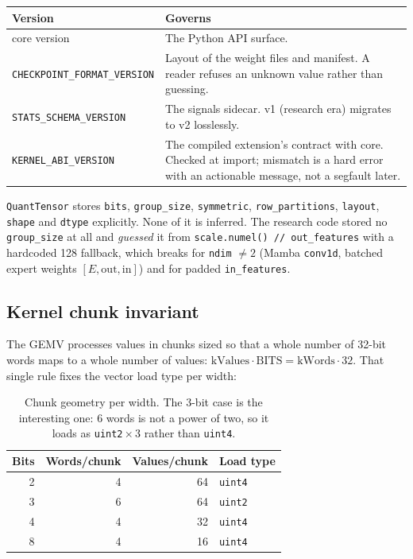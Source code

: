 \documentclass[11pt]{article}
\newcommand{\code}[1]{\texttt{#1}}
\begin{document}
\begin{table}[H]
\centering\small
\begin{tabular}{lp{}}
\toprule
Version & Governs \\
\midrule
core version & The Python API surface. \\
\rowcolor{rowtint}
\code{CHECKPOINT\_FORMAT\_VERSION} & Layout of the weight files and manifest. A reader refuses an
unknown value rather than guessing. \\
\code{STATS\_SCHEMA\_VERSION} & The signals sidecar. v1 (research era) migrates to v2 losslessly. \\
\rowcolor{rowtint}
\code{KERNEL\_ABI\_VERSION} & The compiled extension's contract with core. Checked at import;
mismatch is a hard error with an actionable message, not a segfault later. \\
\bottomrule
\end{tabular}
\end{table}

\code{QuantTensor} stores \code{bits}, \code{group\_size}, \code{symmetric},
\code{row\_partitions}, \code{layout}, \code{shape} and \code{dtype} explicitly. None of it is
inferred. The research code stored no \code{group\_size} at all and \emph{guessed} it from
\code{scale.numel() // out\_features} with a hardcoded 128 fallback, which breaks for
\code{ndim} $\ne 2$ (Mamba \code{conv1d}, batched expert weights $[E,\text{out},\text{in}]$) and
for padded \code{in\_features}.

\subsection{Kernel chunk invariant}

The GEMV processes values in chunks sized so that a whole number of 32-bit words maps to a whole
number of values: $\text{kValues} \cdot \text{BITS} = \text{kWords} \cdot 32$. That single rule
fixes the vector load type per width:

\begin{table}[H]
\centering\small
\caption{Chunk geometry per width. The 3-bit case is the interesting one: 6 words is not a power
of two, so it loads as \code{uint2}${}\times{}$3 rather than \code{uint4}.}
\begin{tabular}{rrrl}
\toprule
Bits & Words/chunk & Values/chunk & Load type \\
\midrule
2 & 4 & 64 & \code{uint4} \\
\rowcolor{rowtint}
3 & 6 & 64 & \code{uint2} \\
4 & 4 & 32 & \code{uint4} \\
\rowcolor{rowtint}
8 & 4 & 16 & \code{uint4} \\
\bottomrule
\end{tabular}
\end{table}
\end{document}
